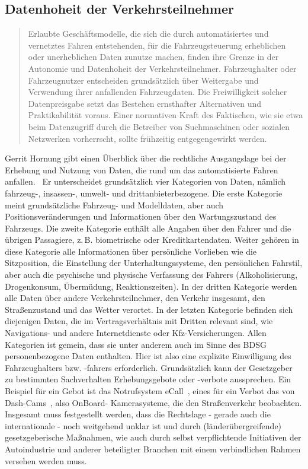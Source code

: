 \documentclass[twoside,a4paper,12pt]{article}
\begin{document}
\subsection{Datenhoheit der Verkehrsteilnehmer} \label{DatenhoheitDerVerkehrsteilnehmer}

\begin{quote}
\glqq
Erlaubte Geschäftsmodelle, die sich die durch automatisiertes und vernetztes Fahren entstehenden, für die Fahrzeugsteuerung 
erheblichen oder unerheblichen Daten zunutze
machen, finden ihre Grenze in der Autonomie und Datenhoheit der Verkehrsteilnehmer.
Fahrzeughalter oder Fahrzeugnutzer entscheiden grundsätzlich über Weitergabe und
Verwendung ihrer anfallenden Fahrzeugdaten. Die Freiwilligkeit solcher Datenpreisgabe
setzt das Bestehen ernsthafter Alternativen und Praktikabilität voraus. Einer normativen
Kraft des Faktischen, wie sie etwa beim Datenzugriff durch die Betreiber von Suchmaschinen oder sozialen Netzwerken vorherrscht, 
sollte frühzeitig entgegengewirkt werden.\grqq\mbox{~\cite[S. 12]{ek}}
\end{quote}

Gerrit Hornung gibt einen Überblick über die rechtliche Ausgangslage bei der Erhebung und Nutzung von Daten, die rund um das automatisierte Fahren
anfallen.~\cite{ho} Er unterscheidet grundsätzlich vier Kategorien von Daten, nämlich fahrzeug-, insassen-, umwelt- und 
drittanbieterbezogene. Die erste Kategorie meint grundsätzliche Fahrzeug- und Modelldaten, aber auch Positionsveränderungen und Informationen über den
Wartungszustand des Fahrzeugs. Die zweite Kategorie enthält alle Angaben über den Fahrer und die übrigen Passagiere, z.\,B. biometrische oder Kreditkartendaten.
Weiter gehören in diese Kategorie alle Informationen über persönliche Vorlieben wie die Sitzposition, die Einstellung der Unterhaltungssysteme, den
persönlichen Fahrstil, aber auch die psychische und physische Verfassung des Fahrers (Alkoholisierung, Drogenkonsum, Übermüdung, Reaktionszeiten).
In der dritten Kategorie werden alle Daten über andere Verkehrsteilnehmer, den Verkehr insgesamt, den Straßenzustand und das Wetter verortet.
In der letzten Kategorie befinden sich diejenigen Daten, die im Vertragsverhältnis mit Dritten relevant sind, wie Navigations- und andere Internetdienste oder
Kfz-Versicherungen.
Allen Kategorien ist gemein, dass sie unter anderem auch im Sinne des BDSG personenbezogene Daten enthalten. Hier ist also eine explizite Einwilligung
des Fahrzeughalters bzw. -fahrers erforderlich. Grundsätzlich kann der Gesetzgeber zu bestimmten Sachverhalten Erhebungsgebote oder -verbote aussprechen.
Ein Beispiel für ein Gebot ist das Notrufsystem eCall\mbox{~\cite[S. 362]{ho}}, eines für ein Verbot das von Dash-Cams\mbox{~\cite[S. 363]{ho}}, also OnBoard-
Kamerasysteme, die den Straßenverkehr beobachten. Insgesamt muss festgestellt werden, dass die Rechtslage - gerade auch die internationale - noch weitgehend 
unklar ist und durch (länderübergreifende) gesetzgeberische Maßnahmen, wie auch durch selbst verpflichtende Initiativen der Autoindustrie und anderer beteiligter 
Branchen mit einem verbindlichen Rahmen versehen werden muss.
\end{document}
